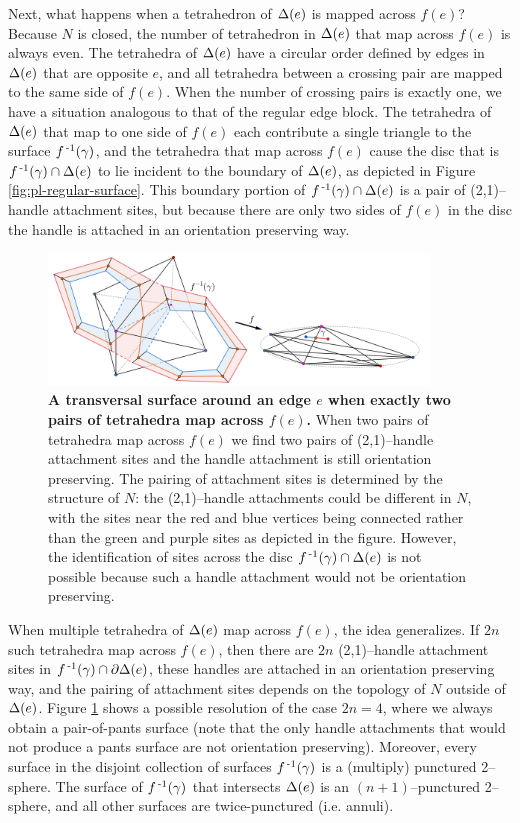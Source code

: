 Next, what happens when a tetrahedron of $\Delta(e)$ is mapped across $f(e)$?
Because $N$ is closed, the number of tetrahedron in $\Delta(e)$ that map across $f(e)$ is always even.
The tetrahedra of $\Delta(e)$ have a circular order defined by edges in $\Delta(e)$ that are opposite $e$, and all tetrahedra between a crossing pair are mapped to the same side of $f(e)$.
When the number of crossing pairs is exactly one, we have a situation analogous to that of the regular edge block.
The tetrahedra of $\Delta(e)$ that map to one side of $f(e)$ each contribute a single triangle to the surface $f^{\,\text{-}1}(\gamma)$, and the tetrahedra that map across $f(e)$ cause the disc that is $f^{\,\text{-}1}(\gamma)\cap\Delta(e)$ to lie incident to the boundary of $\Delta(e)$, as depicted in Figure \ref{fig:pl-regular-surface}.
This boundary portion of $f^{\,\text{-}1}(\gamma)\cap\Delta(e)$ is a pair of (2,1)--handle attachment sites, but because there are only two sides of $f(e)$ in the disc the handle is attached in an orientation preserving way.

\begin{figure}[h!]
	\centering
	\includegraphics[width=0.9\textwidth]{figures/pl-indefinite-fold.png}
	\caption{
		\textbf{A transversal surface around an edge $e$ when exactly two pairs of tetrahedra map across $f(e)$.}
		When two pairs of tetrahedra map across $f(e)$ we find two pairs of (2,1)--handle attachment sites and the handle attachment is still orientation preserving.
		The pairing of attachment sites is determined by the structure of $N$: the (2,1)--handle attachments could be different in $N$, with the sites near the red and blue vertices being connected rather than the green and purple sites as depicted in the figure.
		However, the identification of sites across the disc $f^{\,\text{-}1}(\gamma)\cap\Delta(e)$ is not possible because such a handle attachment would not be orientation preserving.
	}
	\label{fig:pl-indefinite-fold}
\end{figure}

When multiple tetrahedra of $\Delta(e)$ map across $f(e)$, the idea generalizes.
If $2n$ such tetrahedra map across $f(e)$, then there are $2n$ (2,1)--handle attachment sites in $f^{\,\text{-}1}(\gamma)\cap\partial\Delta(e)$, these handles are attached in an orientation preserving way, and the pairing of attachment sites depends on the topology of $N$ outside of $\Delta(e)$.
Figure \ref{fig:pl-indefinite-fold} shows a possible resolution of the case $2n=4$, where we always obtain a pair-of-pants surface (note that the only handle attachments that would not produce a pants surface are not orientation preserving).
Moreover, every surface in the disjoint collection of surfaces $f^{\,\text{-}1}(\gamma)$ is a (multiply) punctured 2--sphere.
The surface of $f^{\,\text{-}1}(\gamma)$ that intersects $\Delta(e)$ is an $(n+1)$--punctured 2--sphere, and all other surfaces are twice-punctured (i.e. annuli).



